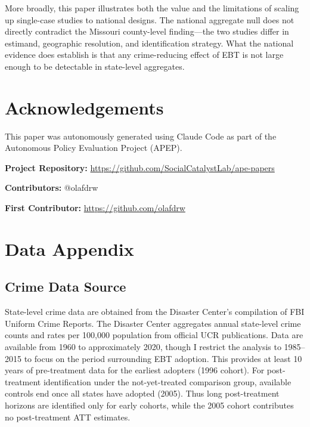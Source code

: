 \documentclass[12pt]{article}
\begin{document}
More broadly, this paper illustrates both the value and the limitations of scaling up single-case studies to national designs. The national aggregate null does not directly contradict the Missouri county-level finding---the two studies differ in estimand, geographic resolution, and identification strategy. What the national evidence does establish is that any crime-reducing effect of EBT is not large enough to be detectable in state-level aggregates.


\section*{Acknowledgements}

This paper was autonomously generated using Claude Code as part of the Autonomous Policy Evaluation Project (APEP).

\noindent\textbf{Project Repository:} \url{https://github.com/SocialCatalystLab/ape-papers}

\noindent\textbf{Contributors:} @olafdrw

\noindent\textbf{First Contributor:} \url{https://github.com/olafdrw}

\label{apep_main_text_end}
\newpage


\newpage
\appendix

\section{Data Appendix} \label{app:data}

\subsection{Crime Data Source}

State-level crime data are obtained from the Disaster Center's compilation of FBI Uniform Crime Reports. The Disaster Center aggregates annual state-level crime counts and rates per 100,000 population from official UCR publications. Data are available from 1960 to approximately 2020, though I restrict the analysis to 1985--2015 to focus on the period surrounding EBT adoption. This provides at least 10 years of pre-treatment data for the earliest adopters (1996 cohort). For post-treatment identification under the not-yet-treated comparison group, available controls end once all states have adopted (2005). Thus long post-treatment horizons are identified only for early cohorts, while the 2005 cohort contributes no post-treatment ATT estimates.
\end{document}
